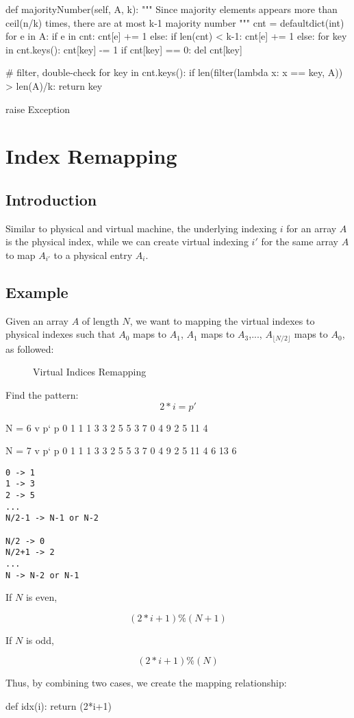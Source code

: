\begin{python}

def majorityNumber(self, A, k):
    """
    Since majority elements appears more 
    than ceil(n/k) times, there are at 
    most k-1 majority number
    """
    cnt = defaultdict(int)
    for e in A:
        if e in cnt:
            cnt[e] += 1
        else:
            if len(cnt) < k-1:
                cnt[e] += 1
            else:
                for key in cnt.keys():
                    cnt[key] -= 1
                    if cnt[key] == 0:
                        del cnt[key]
    
    
    # filter, double-check
    for key in cnt.keys():
        if len(filter(lambda x: x == key, A)) 
            > len(A)/k:
            return key

    raise Exception
\end{python}

\section{Index Remapping}
\subsection{Introduction}
 Similar to physical and virtual machine, the underlying indexing $i$ for an array $A$ is the physical index, while we can create virtual indexing $i'$ for the same array $A$ to map $A_{i'}$ to a physical entry $A_{i}$.
\subsection{Example}
 Given an array $A$ of length $N$, we want to mapping the virtual indexes to physical indexes such that $A_0$ maps to $A_1$, $A_1$ maps to $A_3$,..., $A_{\lfloor N/2\rfloor}$ maps to $A_0$, as followed: 
\begin{figure}[hbtp]
\centering
{}
\caption{Virtual Indices Remapping}
\label{fig:virtual_indexes}
\end{figure}

Find the pattern: 
$$
2*i = p'
$$
\begin{python}
N = 6
v	p`	p
0	1	1
1	3	3
2	5	5
3	7	0
4	9	2
5	11	4

N = 7
v	p`	p
0	1	1
1	3	3
2	5	5
3	7	0
4	9	2
5	11	4
6	13	6

\end{python}
\begin{lstlisting}
0 -> 1
1 -> 3
2 -> 5
...
N/2-1 -> N-1 or N-2

N/2 -> 0
N/2+1 -> 2
...
N -> N-2 or N-1
\end{lstlisting}


If $N$ is even, 

$$
(2*i+1)\%(N+1)
$$

If $N$ is odd,

$$
(2*i+1)\%(N)
$$

Thus, by combining two cases, we create the mapping relationship: 
\begin{python}
def idx(i):
    return (2*i+1) %
\end{python}

